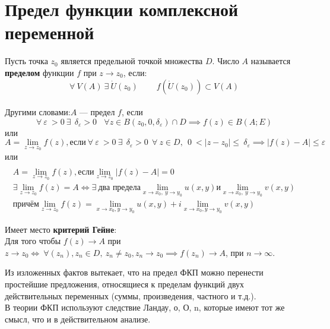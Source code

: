 \documentclass[a4paper, 12pt]{report}
\begin{document}
\section{Предел функции комплексной переменной}
Пусть точка $z_0$ является предельной точкой множества $D$. Число $A$ называется \textbf{пределом} функции $f$ при $z \to z_0$, если:
\begin{equation}
	\forall \  V(A) \  \exists \ \dot U (z_0) \ \ \ \ \ \ \ \ \ \ f(\dot U (z_0)) \subset V(A)
\end{equation}
\\ Другими словами:$A$ --- предел $f$, если
\begin{equation}
	\forall \ \varepsilon \ > 0 \ \exists \ \ \delta_\varepsilon > 0 \ \ \ \ \forall z \in B(z_0, 0, \delta_\varepsilon) \cap D \implies f(z) \in B(A; E)
\end{equation}
или
\begin{equation}
A = \lim\limits_{z \to z_0} f(z), \text{если} \ \forall \ \varepsilon \ > 0 \ \exists \ \ \delta_\varepsilon > 0 \ \ \forall \ z \in D,\ \ 0\ <|z - z_0| \leq \ \delta_\varepsilon \implies |f(z) - A|\leq \varepsilon
\end{equation}
или
\begin{multline}
	\\
	A = \lim\limits_{z \to z_0} f(z), \text{если} \lim\limits_{z \to z_0}|f(z) - A| = 0\\
	\exists \lim\limits_{z \to z_0} f(z) = A \iff \exists \  \text{два предела} \lim\limits_{x \to x_0,\  y \to y_0} u(x,y) и \lim\limits_{x \to x_0,\  y \to y_0} v(x,y)
	\\
	\text{причём} \lim\limits_{z \to z_0}f(z) = \lim\limits_{x\to x_0, y \to y_0} u(x,y) + i \lim\limits_{x \to x_0, y \to y_0} v(x,y)
\end{multline}
\par\bigskip
Имеет место \textbf{критерий Гейне}:
\\Для того чтобы $f(z) \rightarrow A$ при $z \rightarrow z_0 \iff \ \forall (z_n), z_n \in D, \ z_n \neq z_0, z_n \to z_0 \implies f(z_n)  \to A$, при $n \to \infty$.
\par\bigskip
Из изложенных фактов вытекает, что на предел ФКП можно перенести простейшие предложения, относящиеся к пределам функций двух действительных переменных (суммы, произведения, частного и т.д.).
\\В теории ФКП используют следствие Ландау, о, О, n, которые имеют тот же смысл, что и в действительном анализе.

\par\bigskip
\end{document}
